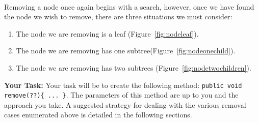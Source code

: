 \vspace{0.25cm}\\
Removing a node once again begins with a search, however, once we have found
the node we wish to remove, there are three situations we must consider:
\begin{enumerate}
    \item The node we are removing is a leaf (Figure~\ref{fig:nodeleaf}).
    \item The node we are removing has one subtree(Figure~\ref{fig:nodeonechild}).
    \item The node we are removing has two subtrees (Figure~\ref{fig:nodetwochildren}).
\end{enumerate}

\textbf{Your Task: } Your task will be to create the following method:
\lstinline|public void remove(??){ ... }|. The parameters of this method
 are up to you and the approach you take. A suggested strategy for dealing with
 the various removal cases enumerated above is detailed in the following
 sections.

